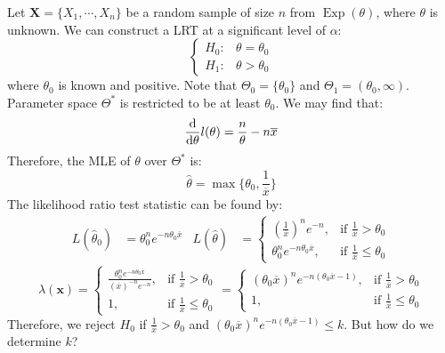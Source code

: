 \documentclass{huhtakm-template-book-v2}
\DeclareMathOperator{\Exp}{Exp}
\begin{document}
\begin{eg}
	Let $\mathbf{X}=\{X_{1},\cdots,X_{n}\}$ be a random sample of size $n$ from $\Exp(\theta)$, where $\theta$ is unknown. We can construct a LRT at a significant level of $\alpha$:
	\begin{equation*}
		\begin{cases}
			H_{0}: &\theta=\theta_{0}\\
			H_{1}: &\theta>\theta_{0}
		\end{cases}
	\end{equation*}
	where $\theta_{0}$ is known and positive. Note that $\Theta_{0}=\{\theta_{0}\}$ and $\Theta_{1}=(\theta_{0},\infty)$. Parameter space $\Theta^{*}$ is restricted to be at least $\theta_{0}$. We may find that:
	\begin{equation*}
		\odv*{l(\theta)}{\theta}=\frac{n}{\theta}-n\overline{x}
	\end{equation*}
	Therefore, the MLE of $\theta$ over $\Theta^{*}$ is:
	\begin{equation*}
		\hat{\theta}=\max\biggl\{\theta_{0},\frac{1}{\overline{x}}\biggr\}
	\end{equation*}
	The likelihood ratio test statistic can be found by:
	\begin{align*}
		L(\hat{\theta}_{0})&=\theta_{0}^{n}e^{-n\theta_{0}\overline{x}} & L(\hat{\theta})&=\begin{cases}
			\left(\frac{1}{\overline{x}}\right)^{n}e^{-n}, &\text{if }\frac{1}{\overline{x}}>\theta_{0}\\
			\theta_{0}^{n}e^{-n\theta_{0}\overline{x}}, &\text{if }\frac{1}{\overline{x}}\leq\theta_{0}
		\end{cases}
	\end{align*}
	\begin{equation*}
		\lambda(\mathbf{x})=\begin{cases}
			\frac{\theta_{0}^{n}e^{-n\theta_{0}\overline{x}}}{(\overline{x})^{-n}e^{-n}}, &\text{if }\frac{1}{\overline{x}}>\theta_{0}\\
			1, &\text{if }\frac{1}{\overline{x}}\leq\theta_{0}
		\end{cases}=\begin{cases}
			(\theta_{0}\overline{x})^{n}e^{-n(\theta_{0}\overline{x}-1)}, &\text{if }\frac{1}{\overline{x}}>\theta_{0}\\
			1, &\text{if }\frac{1}{\overline{x}}\leq\theta_{0}
		\end{cases}
	\end{equation*}
	Therefore, we reject $H_{0}$ if $\frac{1}{\overline{x}}>\theta_{0}$ and $(\theta_{0}\overline{x})^{n}e^{-n(\theta_{0}\overline{x}-1)}\leq k$. But how do we determine $k$?
	

\end{eg}
\end{document}
